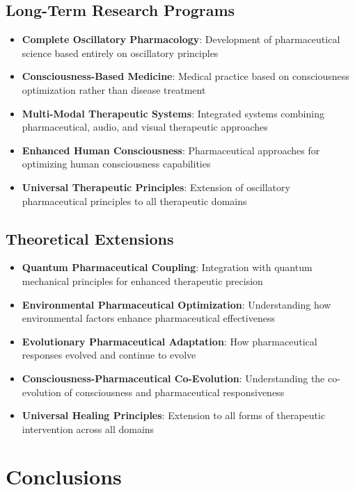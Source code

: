 \documentclass[12pt,a4paper]{article}
\begin{document}
\subsection{Long-Term Research Programs}

\begin{itemize}
\item \textbf{Complete Oscillatory Pharmacology}: Development of pharmaceutical science based entirely on oscillatory principles
\item \textbf{Consciousness-Based Medicine}: Medical practice based on consciousness optimization rather than disease treatment
\item \textbf{Multi-Modal Therapeutic Systems}: Integrated systems combining pharmaceutical, audio, and visual therapeutic approaches
\item \textbf{Enhanced Human Consciousness}: Pharmaceutical approaches for optimizing human consciousness capabilities
\item \textbf{Universal Therapeutic Principles}: Extension of oscillatory pharmaceutical principles to all therapeutic domains
\end{itemize}

\subsection{Theoretical Extensions}

\begin{itemize}
\item \textbf{Quantum Pharmaceutical Coupling}: Integration with quantum mechanical principles for enhanced therapeutic precision
\item \textbf{Environmental Pharmaceutical Optimization}: Understanding how environmental factors enhance pharmaceutical effectiveness
\item \textbf{Evolutionary Pharmaceutical Adaptation}: How pharmaceutical responses evolved and continue to evolve
\item \textbf{Consciousness-Pharmaceutical Co-Evolution}: Understanding the co-evolution of consciousness and pharmaceutical responsiveness
\item \textbf{Universal Healing Principles}: Extension to all forms of therapeutic intervention across all domains
\end{itemize}

\section{Conclusions}
\end{document}
